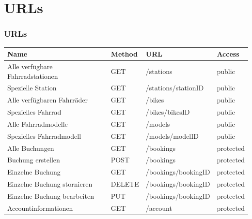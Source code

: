 \section{URLs}
\begin{frame}
	\frametitle*{URLs}
	\begin{tabularx}{\columnwidth}{|X|p{1cm}|p{2.5cm}|p{1.5cm}|}
		\hline
		Name & Method & URL & Access \\
		\hline
		\hline
		Alle verfügbare Fahrradstationen & GET & /stations & public \\
		\hline
		Spezielle Station & GET & /stations/stationID & public \\
		\hline
		Alle verfügbaren Fahrräder & GET & /bikes & public \\
		\hline
		Spezielles Fahrrad & GET & /bikes/bikesID & public \\
		\hline
		Alle Fahrradmodelle & GET & /models & public \\
		\hline
		Spezielles Fahrradmodell & GET & /models/modelID & public \\
		\hline
		Alle Buchungen & GET & /bookings & protected \\
		\hline
		Buchung erstellen & POST & /bookings & protected \\
		\hline
		Einzelne Buchung & GET & /bookings/bookingID & protected \\
		\hline
		Einzelne Buchung stornieren & DELETE & /bookings/bookingID & protected \\
		\hline
		Einzelne Buchung bearbeiten & PUT & /bookings/bookingID & protected \\
		\hline
		Accountinformationen & GET & /account & protected \\
		\hline
	\end{tabularx}
\end{frame}

